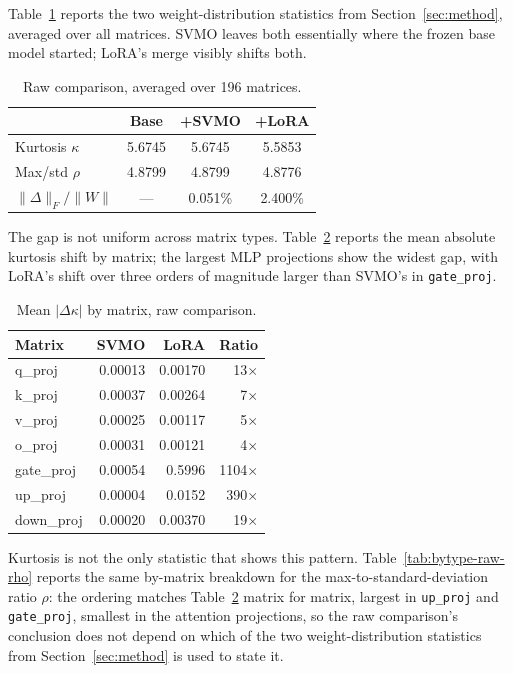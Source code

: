 \documentclass[conference]{IEEEtran}
\begin{document}
Table~\ref{tab:raw} reports the two weight-distribution statistics from Section~\ref{sec:method}, averaged over all matrices. SVMO leaves both essentially where the frozen base model started; LoRA's merge visibly shifts both.

\begin{table}[t]
\centering
\caption{Raw comparison, averaged over 196 matrices.}
\label{tab:raw}
\begin{tabular}{@{}lccc@{}}
\toprule
 & Base & +SVMO & +LoRA \\
\midrule
Kurtosis $\kappa$ & 5.6745 & 5.6745 & 5.5853 \\
Max/std $\rho$ & 4.8799 & 4.8799 & 4.8776 \\
$\|\Delta\|_F/\|W\|$ & --- & 0.051\% & 2.400\% \\
\bottomrule
\end{tabular}
\end{table}

The gap is not uniform across matrix types. Table~\ref{tab:bytype-raw} reports the mean absolute kurtosis shift by matrix; the largest MLP projections show the widest gap, with LoRA's shift over three orders of magnitude larger than SVMO's in \texttt{gate\_proj}.

\begin{table}[t]
\centering
\caption{Mean $|\Delta\kappa|$ by matrix, raw comparison.}
\label{tab:bytype-raw}
\begin{tabular}{@{}lrrr@{}}
\toprule
Matrix & SVMO & LoRA & Ratio \\
\midrule
q\_proj & 0.00013 & 0.00170 & 13$\times$ \\
k\_proj & 0.00037 & 0.00264 & 7$\times$ \\
v\_proj & 0.00025 & 0.00117 & 5$\times$ \\
o\_proj & 0.00031 & 0.00121 & 4$\times$ \\
gate\_proj & 0.00054 & 0.5996 & 1104$\times$ \\
up\_proj & 0.00004 & 0.0152 & 390$\times$ \\
down\_proj & 0.00020 & 0.00370 & 19$\times$ \\
\bottomrule
\end{tabular}
\end{table}

Kurtosis is not the only statistic that shows this pattern. Table~\ref{tab:bytype-raw-rho} reports the same by-matrix breakdown for the max-to-standard-deviation ratio $\rho$: the ordering matches Table~\ref{tab:bytype-raw} matrix for matrix, largest in \texttt{up\_proj} and \texttt{gate\_proj}, smallest in the attention projections, so the raw comparison's conclusion does not depend on which of the two weight-distribution statistics from Section~\ref{sec:method} is used to state it.
\end{document}

